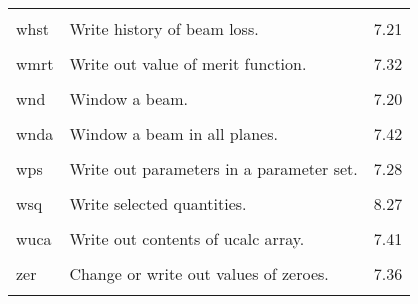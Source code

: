 \begin{center}
\begin{tabular}{lll}
\vspace{-3mm}& &\\
\hspace{1.5em}whst  &    Write history of beam loss.      & \hspace{2em}7.21\\
\vspace{-3mm}& &\\
\hspace{1.5em}wmrt  &   Write out value of merit function.   & \hspace{2em}7.32\\
\vspace{-3mm}& &\\
\hspace{1.5em}wnd  &    Window a beam.  & \hspace{2em}7.20\\
\vspace{-3mm}& &\\
\hspace{1.5em}wnda  &    Window a beam in all planes.  & \hspace{2em}7.42\\
\vspace{-3mm}& &\\
\hspace{1.5em}wps   & Write out parameters in a parameter set.  & \hspace{2em}7.28\\
\vspace{-3mm}& &\\
\hspace{1.5em}wsq     &           Write selected quantities.  & \hspace{2em}8.27 \\
\vspace{-3mm}& &\\
\hspace{1.5em}wuca  &   Write out contents of ucalc array.       &
\hspace{2em}7.41\\
\vspace{-3mm}& &\\
\hspace{1.5em}zer  &   Change or write out values of zeroes.       &
\hspace{2em}7.36\\
\vspace{-3mm}& &\\
\end{tabular}
\end{center}

